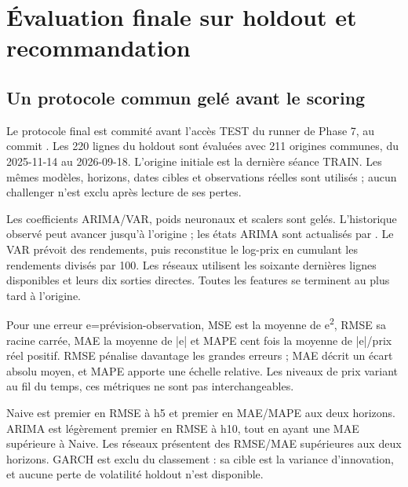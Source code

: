 \section{Évaluation finale sur holdout et recommandation}
\label{sec:evaluation}

\subsection{Un protocole commun gelé avant le scoring}



Le protocole final est commité avant l’accès TEST du runner de Phase 7, au commit . Les 220 lignes du holdout sont évaluées avec 211 origines communes, du 2025-11-14 au 2026-09-18. L’origine initiale est la dernière séance TRAIN. Les mêmes modèles, horizons, dates cibles et observations réelles sont utilisés ; aucun challenger n’est exclu après lecture de ses pertes.



Les coefficients ARIMA/VAR, poids neuronaux et scalers sont gelés. L’historique observé peut avancer jusqu’à l’origine ; les états ARIMA sont actualisés par  \cite{R14}. Le VAR prévoit des rendements, puis reconstitue le log-prix en cumulant les rendements divisés par 100. Les réseaux utilisent les soixante dernières lignes disponibles et leurs dix sorties directes. Toutes les features se terminent au plus tard à l’origine.







Pour une erreur e=prévision-observation, MSE est la moyenne de e\textsuperscript{2}, RMSE sa racine carrée, MAE la moyenne de |e| et MAPE cent fois la moyenne de |e|/prix réel positif. RMSE pénalise davantage les grandes erreurs ; MAE décrit un écart absolu moyen, et MAPE apporte une échelle relative. Les niveaux de prix variant au fil du temps, ces métriques ne sont pas interchangeables.



Naive est premier en RMSE à h5 et premier en MAE/MAPE aux deux horizons. ARIMA est légèrement premier en RMSE à h10, tout en ayant une MAE supérieure à Naive. Les réseaux présentent des RMSE/MAE supérieures aux deux horizons. GARCH est exclu du classement : sa cible est la variance d’innovation, et aucune perte de volatilité holdout n’est disponible.



